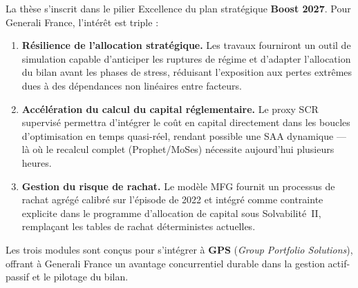 \documentclass[10pt,a4paper]{article}
\begin{document}
La thèse s'inscrit dans le pilier \og{}Excellence\fg{} du plan stratégique
\textbf{Boost 2027}.  Pour Generali France, l'intérêt est triple :

\begin{enumerate}[leftmargin=2em,itemsep=4pt]
  \item \textbf{Résilience de l'allocation stratégique.}
        Les travaux fourniront un outil de simulation capable d'anticiper les
        ruptures de régime et d'adapter l'allocation du bilan avant les phases
        de stress, réduisant l'exposition aux pertes extrêmes dues à des
        dépendances non linéaires entre facteurs.

  \item \textbf{Accélération du calcul du capital réglementaire.}
        Le proxy SCR supervisé permettra d'intégrer le coût en capital
        directement dans les boucles d'optimisation en temps quasi-réel,
        rendant possible une SAA dynamique --- là où le recalcul complet
        (Prophet/MoSes) nécessite aujourd'hui plusieurs heures.

  \item \textbf{Gestion du risque de rachat.}
        Le modèle MFG fournit un processus de rachat agrégé calibré sur
        l'épisode de 2022 et intégré comme contrainte explicite dans le
        programme d'allocation de capital sous Solvabilité~II, remplaçant
        les tables de rachat déterministes actuelles.
\end{enumerate}

\medskip
\noindent Les trois modules sont conçus pour s'intégrer à \textbf{GPS}
(\textit{Group Portfolio Solutions}), offrant à Generali France un avantage
concurrentiel durable dans la gestion actif-passif et le pilotage du bilan.
\end{document}
